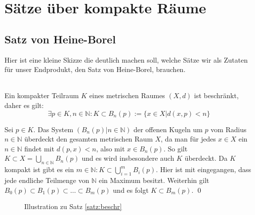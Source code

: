 \chapter{Sätze über kompakte Räume}

\section{Satz von Heine-Borel}
%
Hier ist eine kleine Skizze die deutlich machen soll, welche Sätze wir als Zutaten für unser Endprodukt, den \glqq Satz von Heine-Borel\grqq, brauchen. \\
%
\\

%

\begin{Satz}\label{satz:beschr}
	Ein kompakter Teilraum \(K\) eines metrischen Raumes \( (X, d) \) ist beschränkt, daher es gilt:
	\[ \exists p \in K, n \in \mathbb{N} : K \subset B_n(p) := \{ x \in X | d(x,p) < n \} \]
\end{Satz}
	Sei \(p \in K\). Das System \( (B_{n}(p) | n \in \mathbb{N}) \) der offenen Kugeln um \(p\) vom Radius \(n \in \mathbb{N}\) 
	überdeckt den gesamten metrischen Raum \(X\), da man für jedes \(x \in X\) ein \(n \in \mathbb{N}\) findet mit \(d(p,x) < n\),
	also mit \(x \in B_{n}(p)\).
	So gilt \(K \subset X = \bigcup_{n \in \mathbb{N}} B_{n}(p)\) und es wird insbesondere auch \(K\) überdeckt. 
	Da \(K\) kompakt ist gibt es ein \(m \in \mathbb{N} : K \subset \bigcup_{i=1}^{m} B_{i}(p) \). Hier ist
	mit eingegangen, dass jede endliche Teilmenge von \(\mathbb{N}\) ein Maximum besitzt.
	Weiterhin gilt \( B_0(p) \subset B_1(p) \subset \dots \subset B_m(p) \) und es folgt \(K \subset B_m(p)\).
\qed

\begin{figure}[ht]
	\centering
	\def\svgwidth{200}
	
	\label{fig:beschraenktheit}
	\caption{Illustration zu Satz \ref{satz:beschr}}
\end{figure}

